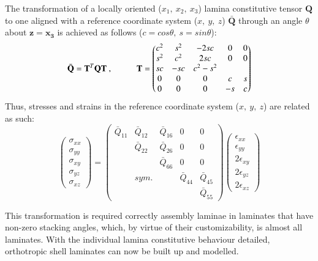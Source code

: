 The transformation of a locally oriented ($x_1,\ x_2,\ x_3$) lamina constitutive tensor $\mathbf{Q}$ to one aligned with a reference coordinate system ($x,\ y,\ z$) $\bar{\mathbf{Q}}$ through an angle $\theta$ about $\mathbf{z}=\mathbf{x_3}$ is achieved as follows ($c = cos\theta,\ s = sin\theta$):
\begin{equation} 
\bar{\mathbf{Q}} = \mathbf{T}^T \mathbf{Q} \mathbf{T}\ ,
\hspace{10mm}
\mathbf{T} =
\begin{pmatrix}
c^2 & s^2 & -2sc & 0 & 0 \\
s^2 & c^2 & 2sc & 0 & 0 \\
sc & -sc & c^2 - s^2 \\
0 & 0 & 0 & c & s \\
 0 & 0 & 0 & -s & c
\end{pmatrix}
\label{eqscomp11}
\end{equation}
Thus, stresses and strains in the reference coordinate system  ($x,\ y,\ z$) are related as such:
\begin{equation} 
\begin{pmatrix}
\sigma_{xx} \\
\sigma_{yy} \\
\sigma_{xy} \\
\sigma_{yz} \\
\sigma_{xz} 
\end{pmatrix}
=
\begin{pmatrix}
\bar{Q}_{11} & \bar{Q}_{12} &  \bar{Q}_{16} & 0 & 0 \\
\  & \bar{Q}_{22} &  \bar{Q}_{26} & 0 & 0 \\
\  & \  & \bar{Q}_{66}  & 0 & 0 \\
\  & sym. & \  & \bar{Q}_{44} & \bar{Q}_{45} \\
\  & \  & \  & \ & \bar{Q}_{55}
\end{pmatrix}
\begin{pmatrix}
\epsilon_{xx} \\
\epsilon_{yy} \\
2\epsilon_{xy}\\
2\epsilon_{yz} \\
2\epsilon_{xz}
\end{pmatrix}
\label{eqscomp_plane_stress_tensor_rotated}
\end{equation}

This transformation is required correctly assembly laminae in laminates that have non-zero stacking angles, which, by virtue of their customizability, is almost all laminates. With the individual lamina constitutive behaviour detailed, orthotropic shell laminates can now be built up and modelled.

